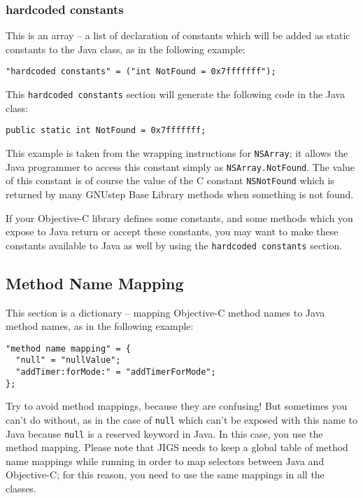 \subsubsection{hardcoded constants}
This is an array -- a list of declaration of constants which will be
added as static constants to the Java class, as in the following
example:
\begin{verbatim}
"hardcoded constants" = ("int NotFound = 0x7fffffff");
\end{verbatim}
This \texttt{hardcoded constants} section will generate the following
code in the Java class:
\begin{verbatim}
public static int NotFound = 0x7fffffff;
\end{verbatim}
This example is taken from the wrapping instructions for
\texttt{NSArray}; it allows the Java programmer to access this
constant simply as \texttt{NSArray.NotFound}.  The value of this
constant is of course the value of the C constant \texttt{NSNotFound}
which is returned by many GNUstep Base Library methods when something
is not found.

If your Objective-C library defines some constants, and some methods
which you expose to Java return or accept these constants, you may
want to make these constants available to Java as well by using the
\texttt{hardcoded constants} section.

\subsection{Method Name Mapping}
This section is a dictionary -- mapping Objective-C method names 
to Java method names, as in the following example:
\begin{verbatim}
"method name mapping" = {
  "null" = "nullValue";
  "addTimer:forMode:" = "addTimerForMode";
};
\end{verbatim}
Try to avoid method mappings, because they are confusing!  But
sometimes you can't do without, as in the case of \texttt{null} which
can't be exposed with this name to Java because \texttt{null} is a
reserved keyword in Java.  In this case, you use the method mapping.
Please note that JIGS needs to keep a global table of method name
mappings while running in order to map selectors between Java and
Objective-C; for this reason, you need to use the same mappings in all
the classes.

